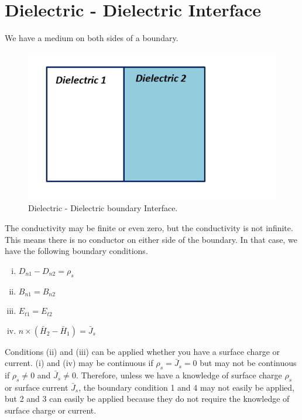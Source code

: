 \section{Dielectric - Dielectric Interface}
We have a medium on both sides of a boundary.
\begin{figure}[h]
\centering
\includegraphics[width=1\linewidth]{graphics/dielectric_dielectric}
\caption{Dielectric - Dielectric boundary Interface.}
\end{figure}

The conductivity may be finite or even zero, but the conductivity is not infinite. This means there is no conductor on either side of the boundary. In that case, we have the following boundary conditions.
\begin{enumerate}[(i)]
\item $D_{n1} - D_{n2} = \rho_s$
\item $B_{n1} = B_{n2}$
\item $E_{t1} = E_{t2}$
\item $\hat{n} \times (\bar{H}_2 - \bar{H}_1) = \bar{J}_s$
\end{enumerate}

Conditions (ii) and (iii) can be applied whether you have a surface charge or current. (i) and (iv) may be continuous if $\rho_s = \bar{J}_s = 0$ but may not be continuous if $\rho_s\neq 0$ and $\bar{J}_s\neq 0$.
Therefore, unless we have a knowledge of surface charge $\rho_s$ or surface current $\bar{J}_s$, the boundary condition 1 and 4 may not easily be applied, but 2 and 3 can easily be applied because they do not require the knowledge of surface charge or current.

